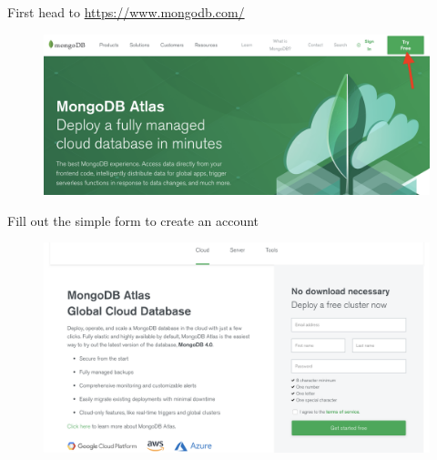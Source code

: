 \documentclass{42-en}
\begin{document}
First head to \href{https://www.mongodb.com/}{https://www.mongodb.com/}

\begin{figure}[H]
    \begin{center}
        \includegraphics[width=14cm]{WEB/mongo_0.png}
    \end{center}
\end{figure}

Fill out the simple form to create an account
\begin{figure}[H]
    \begin{center}
        \includegraphics[width=14cm]{WEB/mongo_1.png}
    \end{center}
\end{figure}
\end{document}
